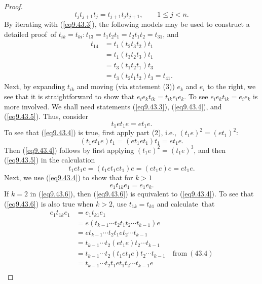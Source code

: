\documentclass{surv-l}
\numberwithin{equation}{section}
\numberwithin{table}{section}
\numberwithin{figure}{section}
\theoremstyle{definition}
\begin{document}
\begin{proof}
\begin{equation}
t_{j}t_{j+1}t_{j}=t_{j+1}t_{j}t_{j+1},\qquad 1\leq j<n.
\end{equation}
By iterating with (\ref{eq9.43.3}), the following models may be
used to construct a detailed proof~of
$t_{ik}=t_{ki}:t_{13}=t_{1}t_{2}t_{1}=t_{2}t_{1}t_{2}=t_{31}$, and
\begin{align*}
t_{14} &=t_{1}(t_{2}t_{3}t_{2})t_{1} \\
&=t_{1}(t_{3}t_{2}t_{3})t_{1} \\
&=t_{3}(t_{1}t_{2}t_{1})t_{3} \\
&=t_{3}(t_{2}t_{1}t_{2})t_{3}=t_{41}.
\end{align*}
Next, by expanding $t_{ik}$ and moving (via statement (3)) $e_{k}$
and $e_{i}$ to the right, we see that it is straightforward to
show that $e_{i}e_{k}t_{ik}=t_{ik}e_{i}e_{k}$. To see
$e_{i}e_{k}t_{ik}=e_{i}e_{k}$ is more involved. We shall need
statements (\ref{eq9.43.3}), (\ref{eq9.43.4}), and
(\ref{eq9.43.5}). Thus, consider
\begin{equation}\label{eq9.43.4}
t_{1}et_{1}e=et_{1}e.
\end{equation}
To see that (\ref{eq9.43.4}) is true, first apply part (2), i.e.,
$(t_{1}e)^{2}=(et_{1})^{2}$:
\begin{equation}\label{eq9.43.5}
(t_{1}et_{1}e)t_{1}=(et_{1}et_{1})t_{1}=et_{1}e.
\end{equation}
Then (\ref{eq9.43.4}) follows by first applying
$(t_{1}e)^{2}=(t_{1}e)^{3}$, and then (\ref{eq9.43.5}) in the
calculation
\[
t_{1}et_{1}e=(t_{1}et_{1}et_{1})e=(et_{1}e)e=et_{1}e.
\]
Next, we use (\ref{eq9.43.4}) to show that for $k>1$
\begin{equation}\label{eq9.43.6}
 e_{1}t_{1k}e_{1}=e_{1}e_{k}.
\end{equation}
If $k=2$ in (\ref{eq9.43.6}), then (\ref{eq9.43.6}) is equivalent
to (\ref{eq9.43.4}). To see that (\ref{eq9.43.6}) is also true
when $k>2$, use $t_{1k}=t_{k1}$ and calculate~that
\begin{align*}
e_{1}t_{1k}e_{1} & =e_{1}t_{k1}e_{1} \\
&=e(t_{k-1}\cdots t_{2}t_{1}t_{2}\cdots t_{k-1})e \\
&=et_{k-1}\cdots t_{2}t_{1}et_{2}\cdots t_{k-1} \\
&=t_{k-1}\cdots t_{2}(et_{1}e)t_{2}\cdots t_{k-1} \\
&=t_{k-1}\cdots t_{2}(t_{1}et_{1}e)t_{2}\cdots t_{k-1}\quad \mathrm{from}\ (43.4) \\
&=t_{k-1}\cdots t_{2}t_{1}et_{1}t_{2}\cdots t_{k-1}e \\

\end{align*}
\end{proof}
\end{document}
